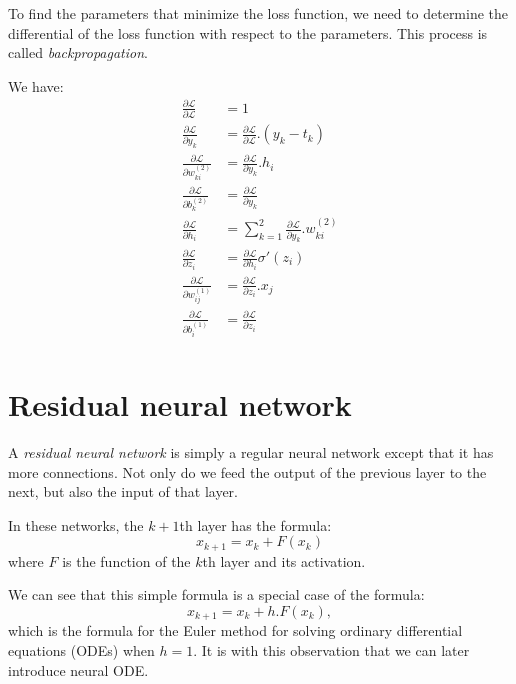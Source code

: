\documentclass[10pt,a4paper]{article}
\theoremstyle{definition}
\theoremstyle{definition}
\begin{document}
To find the parameters that minimize the loss function, we need to determine the differential of the loss function with respect to the parameters. This process is called \textit{backpropagation}.

We have:
\begin{align*}
\frac{\partial \mathcal{L}}{\partial \mathcal{L}} &= 1 \\
\frac{\partial \mathcal{L}}{\partial y_k} &= \frac{\partial \mathcal{L}}{\partial \mathcal{L}} . (y_k - t_k) \\
\frac{\partial \mathcal{L}}{\partial w_{ki}^{(2)}} &= \frac{\partial \mathcal{L}}{\partial y_k} . h_i \\
\frac{\partial \mathcal{L}}{\partial b_k^{(2)}} &= \frac{\partial \mathcal{L}}{\partial y_k} \\
\frac{\partial \mathcal{L}}{\partial h_i} &= \sum_{k = 1}^2 \frac{\partial \mathcal{L}}{\partial y_k} . w_{ki}^{(2)} \\
\frac{\partial \mathcal{L}}{\partial z_i} &= \frac{\partial \mathcal{L}}{\partial h_i} \sigma '(z_i) \\
\frac{\partial \mathcal{L}}{\partial w_{ij}^{(1)}} &= \frac{\partial \mathcal{L}}{\partial z_i} . x_j \\
\frac{\partial \mathcal{L}}{\partial b_i^{(1)}} &= \frac{\partial \mathcal{L}}{\partial z_i} \\
\end{align*}


\section{Residual neural network} \label{rnn}

A \textit{residual neural network} is simply a regular neural network except that it has more connections. Not only do we feed the output of the previous layer to the next, but also the input of that layer. 

In these networks, the $k+1$th layer has the formula:
\[
x_{k+1} = x_k + F(x_k)
\]
where $F$ is the function of the $k$th layer and its activation. 

We can see that this simple formula is a special case of the formula:
\[
x_{k+1} = x_k + h.F(x_k),
\]
which is the formula for the Euler method for solving ordinary differential equations (ODEs) when $h = 1$. It is with this observation that we can later introduce neural ODE.
\end{document}
